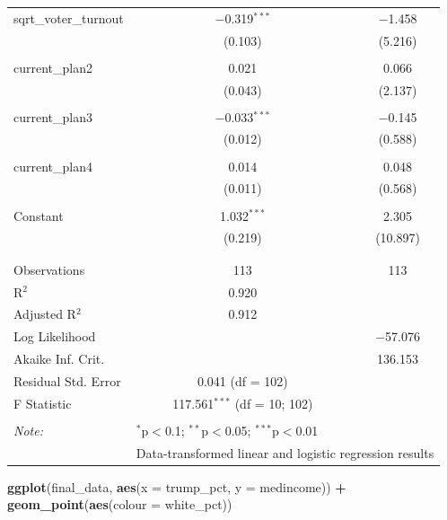 \documentclass[
]{article}
\newenvironment{Shaded}{\begin{snugshade}}{\end{snugshade}}
\newcommand{\DataTypeTok}[1]{\textcolor[rgb]{0.13,0.29,0.53}{#1}}
\newcommand{\KeywordTok}[1]{\textcolor[rgb]{0.13,0.29,0.53}{\textbf{#1}}}
\newcommand{\NormalTok}[1]{#1}
\newcommand{\OperatorTok}[1]{\textcolor[rgb]{0.81,0.36,0.00}{\textbf{#1}}}
\newcommand{\StringTok}[1]{\textcolor[rgb]{0.31,0.60,0.02}{#1}}
\begin{document}
\begin{table}[!htbp]
\begin{tabular}{@{\extracolsep{5pt}}lcc}
 sqrt\_voter\_turnout & $-$0.319$^{***}$ & $-$1.458 \\ 
  & (0.103) & (5.216) \\ 
  & & \\ 
 current\_plan2 & 0.021 & 0.066 \\ 
  & (0.043) & (2.137) \\ 
  & & \\ 
 current\_plan3 & $-$0.033$^{***}$ & $-$0.145 \\ 
  & (0.012) & (0.588) \\ 
  & & \\ 
 current\_plan4 & 0.014 & 0.048 \\ 
  & (0.011) & (0.568) \\ 
  & & \\ 
 Constant & 1.032$^{***}$ & 2.305 \\ 
  & (0.219) & (10.897) \\ 
  & & \\ 
\hline \\[-1.8ex] 
Observations & 113 & 113 \\ 
R$^{2}$ & 0.920 &  \\ 
Adjusted R$^{2}$ & 0.912 &  \\ 
Log Likelihood &  & $-$57.076 \\ 
Akaike Inf. Crit. &  & 136.153 \\ 
Residual Std. Error & 0.041 (df = 102) &  \\ 
F Statistic & 117.561$^{***}$ (df = 10; 102) &  \\ 
\hline 
\hline \\[-1.8ex] 
\textit{Note:}  & \multicolumn{2}{l}{$^{*}$p$<$0.1; $^{**}$p$<$0.05; $^{***}$p$<$0.01} \\ 
 & \multicolumn{2}{l}{Data-transformed linear and logistic regression results} \\ 
\end{tabular} 
\end{table}

\begin{Shaded}
\begin{Highlighting}[]
\KeywordTok{ggplot}\NormalTok{(final_data, }\KeywordTok{aes}\NormalTok{(}\DataTypeTok{x =}\NormalTok{ trump_pct, }\DataTypeTok{y =}\NormalTok{ medincome)) }\OperatorTok{+}
\StringTok{   }\KeywordTok{geom_point}\NormalTok{(}\KeywordTok{aes}\NormalTok{(}\DataTypeTok{colour =}\NormalTok{ white_pct))}
\end{Highlighting}
\end{Shaded}
\end{document}
